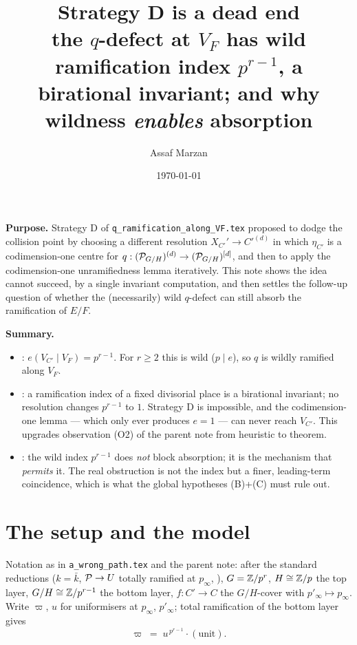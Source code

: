 \documentclass[11pt]{article}
\title{Strategy D is a dead end\\[2pt]
       {\large the $q$-defect at $V_F$ has wild ramification index $p^{r-1}$,
        a birational invariant; and why wildness \emph{enables} absorption}}
\author{Assaf Marzan}
\date{\today}
\begin{document}
\maketitle

\noindent\textbf{Purpose.}
Strategy D of \texttt{q\_ramification\_along\_VF.tex} proposed to dodge the
collision point by choosing a different resolution
$X_{C'}'\to C'^{(d)}$ in which $\eta_{C'}$ is a codimension-one centre for
$q:(\mathcal{P}_{G/H})^{(d)}\to(\mathcal{P}_{G/H})^{[d]}$, and then to apply the
codimension-one unramifiedness lemma
 iteratively. This note shows the idea
cannot succeed, by a single invariant computation, and then settles the
follow-up question of whether the (necessarily) wild $q$-defect can still absorb
the ramification of $E/F$.

\medskip
\noindent\textbf{Summary.}
\begin{itemize}
  \item {}: $e(V_{C'}\mid V_F)=p^{r-1}$. For $r\ge2$ this is
        wild ($p\mid e$), so $q$ is wildly ramified along $V_F$.
  \item {}: a ramification index of a fixed divisorial place is a
        birational invariant; no resolution changes $p^{r-1}$ to $1$. Strategy D
        is impossible, and the codimension-one lemma --- which only ever
        produces $e=1$ --- can never reach $V_{C'}$. This upgrades observation
        (O2) of the parent note from heuristic to theorem.
  \item {}: the wild index $p^{r-1}$ does \emph{not} block
        absorption; it is the mechanism that \emph{permits} it. The real
        obstruction is not the index but a finer, leading-term coincidence,
        which is what the global hypotheses (B)+(C) must rule out.
\end{itemize}

\section{The setup and the model}\label{sec:setup}

Notation as in \texttt{a\_wrong\_path.tex} and the parent note: after the
standard reductions ($k=\bar k$, $\mathcal{P}\to U$ totally ramified at $p_\infty$,
), $G=\mathbb{Z}/p^r$,
$H\cong\mathbb{Z}/p$ the top layer, $G/H\cong\mathbb{Z}/p^{r-1}$ the bottom layer, $f:C'\to C$
the $G/H$-cover with $p'_\infty\mapsto p_\infty$. Write $\varpi$, $u$ for
uniformisers at $p_\infty$, $p'_\infty$; total ramification of the bottom layer
gives
\begin{equation}\label{eq:totram}
\varpi \;=\; u^{\,p^{r-1}}\cdot(\text{unit}) .
\end{equation}
\end{document}

